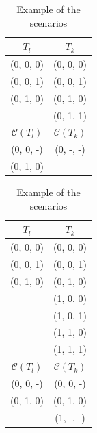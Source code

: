 \documentclass{sig-alternate}
\begin{document}
\begin{table}
\centering
\caption{Example of the scenarios}
\label{example_three_condition}
  \begin{tabular}{cc}
$T_{l}$&$T_{k}$ \\ \hline
(0, 0, 0)&(0, 0, 0)\\
(0, 0, 1)&(0, 0, 1) \\
(0, 1, 0)&(0, 1, 0)\\
         &(0, 1, 1) \\ \hline
 $\mathcal{C}(T_{l})$& $\mathcal{C}(T_{k})$ \\ \hline
(0, 0, -)&(0, -, -)\\
(0, 1, 0)&		   \\ \hline
  \end{tabular}
  \hspace{1em}
  \begin{tabular}{cc}
$T_{l}$&$T_{k}$\\ \hline
(0, 0, 0) & (0, 0, 0)\\
(0, 0, 1) & (0, 0, 1)\\
(0, 1, 0) & (0, 1, 0)\\
		  & (1, 0, 0)\\
		  & (1, 0, 1)\\
		  & (1, 1, 0)\\
		  & (1, 1, 1)\\ \hline
$\mathcal{C}(T_{l})$& $\mathcal{C}(T_{k})$ \\ \hline
(0, 0, -)&  (0, 0, -)\\
(0, 1, 0)&  (0, 1, 0)\\
		 &  (1, -, -)\\  \hline
  \end{tabular}
  \end{table}


\end{document}
